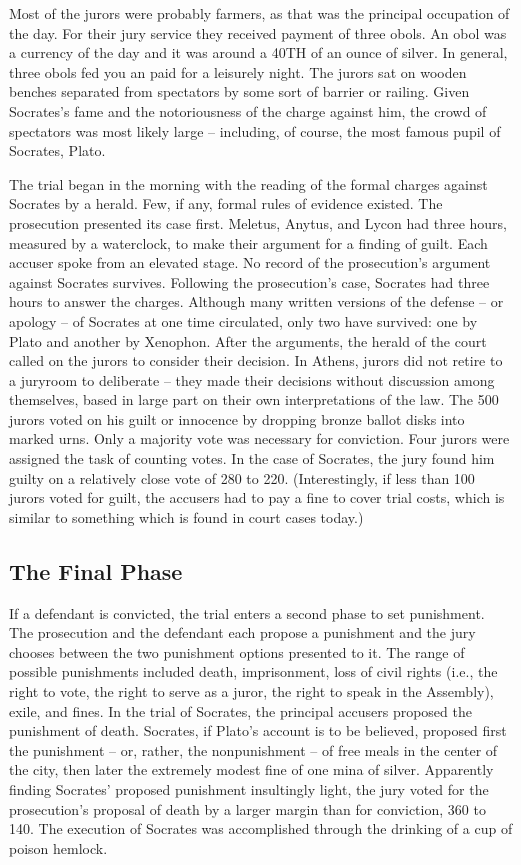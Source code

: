 Most of the jurors were probably farmers, as that was the principal occupation of the day. For their jury service they received payment of three obols. An obol was a currency of the day and it was around a 40TH of an ounce of silver. In general, three obols fed you an paid for a leisurely night. The jurors sat on wooden benches separated from spectators by some sort of barrier or railing. Given Socrates's fame and the notoriousness of the charge against him, the crowd of spectators was most likely large – including, of course, the most famous pupil of Socrates, Plato.

The trial began in the morning with the reading of the formal charges against Socrates by a herald. Few, if any, formal rules of evidence existed. The prosecution presented its case first. Meletus, Anytus, and Lycon had three hours, measured by a waterclock, to make their argument for a finding of guilt. Each accuser spoke from an elevated stage. No record of the prosecution's argument against Socrates survives. Following the prosecution's case, Socrates had three hours to answer the charges. Although many written versions of the defense – or apology – of Socrates at one time circulated, only two have survived: one by Plato and another by Xenophon. After the arguments, the herald of the court called on the jurors to consider their decision. In Athens, jurors did not retire to a juryroom to deliberate – they made their decisions without discussion among themselves, based in large part on their own interpretations of the law. The 500 jurors voted on his guilt or innocence by dropping bronze ballot disks into marked urns. Only a majority vote was necessary for conviction. Four jurors were assigned the task of counting votes. In the case of Socrates, the jury found him guilty on a relatively close vote of 280 to 220. (Interestingly, if less than 100 jurors voted for guilt, the accusers had to pay a fine to cover trial costs, which is similar to something which is found in court cases today.)
\subsection{The Final Phase}

If a defendant is convicted, the trial enters a second phase to set punishment. The prosecution and the defendant each propose a punishment and the jury chooses between the two punishment options presented to it. The range of possible punishments included death, imprisonment, loss of civil rights (i.e., the right to vote, the right to serve as a juror, the right to speak in the Assembly), exile, and fines. In the trial of Socrates, the principal accusers proposed the punishment of death. Socrates, if Plato's account is to be believed, proposed first the punishment – or, rather, the nonpunishment – of free meals in the center of the city, then later the extremely modest fine of one mina of silver. Apparently finding Socrates' proposed punishment insultingly light, the jury voted for the prosecution's proposal of death by a larger margin than for conviction, 360 to 140. The execution of Socrates was accomplished through the drinking of a cup of poison hemlock.

